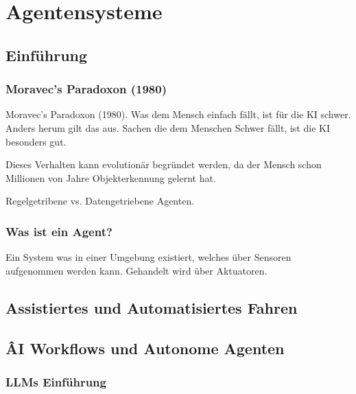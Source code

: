 \documentclass[a4paper]{article}
\title{\docTitle}
\author{Moritz}
\date{\today}
\begin{document}
\maketitle
\tableofcontents


\section{Agentensysteme}

\subsection{Einführung}

\subsubsection{Moravec's Paradoxon (1980)}

Moravec's Paradoxon (1980). Was dem Mensch einfach fällt, ist für die KI schwer. Anders herum gilt das aus. Sachen die dem Menschen Schwer fällt, ist die KI besonders gut.

Dieses Verhalten kann evolutionär begründet werden, da der Mensch schon Millionen von Jahre Objekterkennung gelernt hat.

Regelgetribene vs. Datengetriebene Agenten.

\subsubsection{Was ist ein Agent?}

Ein System was in einer Umgebung existiert, welches über Sensoren aufgenommen werden kann. Gehandelt wird über Aktuatoren.

\subsection{Assistiertes und Automatisiertes Fahren}

\subsection{ÂI Workflows und Autonome Agenten}


\subsubsection{LLMs Einführung}
\end{document}
